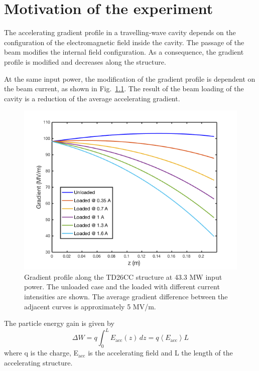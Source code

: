 \chapter[Motivation of the experiment]{Motivation of the experiment}
\label{chap:motivation}

The accelerating gradient profile in a travelling-wave cavity depends on the configuration of the electromagnetic field inside the cavity. The passage of the  beam modifies the internal field configuration. As a consequence, the gradient profile is modified and decreases along the structure.

At the same input power, the modification of the gradient profile is dependent on the beam current, as shown in Fig.~\ref{grad_vs_I}. The result of the beam loading of the cavity is a reduction of the average accelerating gradient.

\begin{figure}[h]
\centering 
\includegraphics[scale=0.5]{pictures/Gradient_vs_current.png}
\caption{Gradient profile along the TD26CC structure at 43.3 MW input power. The unloaded case and the loaded with different current intensities are shown. The average gradient difference between the adjacent curves is approximately 5 MV/m.}
\label{grad_vs_I}
\end{figure}

\noindent
The particle energy gain is given by 
\begin{equation}
\Delta W  = q \int_0^L E_{\text{acc}} (z) \, dz = q \left \langle E_{\text{acc}} \right \rangle L
\label{en_gain}
\end{equation}
where q is the charge, E$_{\text{acc}}$ is the accelerating field and L the length of the accelerating structure.

